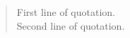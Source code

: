 \documentclass{article}
\begin{document}
\begin{quote}
  First line of quotation.\\
  Second line of quotation.
\end{quote}
\end{document}
